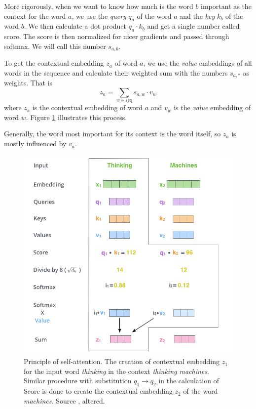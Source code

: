 \documentclass[
  printed, %
  color,   %
  table,   %
  oneside, %
  lof,     %
  lot,     %
]{fithesis3}
\begin{document}
More rigorously, when we want to know how much is the word $b$ important as the context for the word $a$, we use the \textit{query}  $q_a$ of the word $a$ and the \textit{key} $k_b$ of the word $b$. We then calculate a dot product $q_a \cdot k_b$ and get a single number called score. The score is then normalized for nicer gradients and passed through softmax. We will call this number $s_{a,b}$.

To get the contextual embedding $z_a$ of word $a$, we use the \textit{value} embeddings of all words in the sequence and calculate their weighted sum with the numbers $s_{a,*}$ as weights. That is
$$
z_a = \sum_{w  \in  \text{seq}} s_{a,w} \cdot v_w
$$
where $z_a$ is the contextual embedding of word $a$ and $v_w$ is the \textit{value} embedding of word $w$. Figure \ref{fig:selfatt} illustrates this process.

Generally, the word most important for its context is the word itself, so $z_a$ is mostly influenced by $v_a$. 

\begin{figure}[b!]
    \includegraphics[width=\linewidth]{img/self-attention-output-altered.png}
  \caption[Principle of self-attention]{Principle of self-attention. The creation of contextual embedding $z_1$ for the input word \textit{thinking} in the context \textit{thinking machines}. Similar procedure with substitution $q_1 \rightarrow q_2$ in the calculation of Score is done to create the contextual embedding $z_2$ of the word \textit{machines}.  Source \parencite{ilustrtran}, altered. }
  \label{fig:selfatt}
\end{figure}
\end{document}
